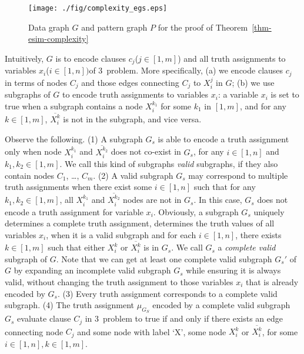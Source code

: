 \begin{figure}[tb!]
\begin{center}
\texttt{[image: ./fig/complexity\_egs.eps]}
\caption{Data graph $G$ and pattern graph $P$ for the proof of
  Theorem~\ref{thm-esim-complexity}}
\label{fig-esim-complexity}
\end{center}
\end{figure}

Intuitively, $G$ is to encode clauses $c_j$($j \in [1,m]$) and all truth assignments to variables $x_i$($i\in[1,n])$of 3\SAT\ problem. More specifically, (a) we encode clauses $c_j$ in terms of nodes $C_j$ and those edges connecting $C_j$ to $X_i^j$ in
$G$; (b) we use subgraphs of $G$ to encode truth assignments to variables $x_i$: a variable $x_i$ is set to true when a subgraph contains a node $X_i^{k_1}$ for some $k_1$ in $[1, m]$, and for any $k\in[1,m]$, $\overline{X_i^k}$ is not in the subgraph, and vice versa.

Observe the following.
(1) A subgraph $G_s$ is able to encode a truth assignment only when
node $X_i^{k_1}$ and $\overline{X_i^{k_2}}$ does not co-exist in
$G_s$, for any $i\in[1,n]$ and $k_1, k_2\in[1, m]$. We call this
kind of subgraphs {\em valid} subgraphs, if they also contain nodes
$C_1$, \ldots, $C_m$.
(2) A valid subgraph $G_s$ may correspond to multiple truth assignments
when there exist some $i\in [1,n]$ such that for any
$k_1,k_2\in[1,m]$, all $X_i^{k_1}$ and $\overline{X_i^{k_2}}$ nodes
are not in $G_s$. In this case, $G_s$ does not encode a truth
assignment for variable $x_i$. Obviously, a subgraph $G_s$ uniquely
determines a complete truth assignment, \ie determines the truth
values of all variables $x_i$, when it is a
valid subgraph and for each $i\in[1, n]$, there exists $k\in[1,
m]$ such that either $X_i^k$ or $\overline{X_i^k}$ is in $G_s$. We
call $G_s$ a {\em complete valid} subgraph of $G$. Note that we can
get at least one complete valid subgraph $G_s'$ of $G$ by expanding an
incomplete valid subgraph $G_s$ while ensuring it is always valid, without
changing the truth assignment to those variables $x_i$ that is already
encoded by $G_s$.
(3) Every truth assignment corresponds to a complete valid subgraph.
(4) The truth assignment $\mu_{G_S}$ encoded by a complete valid
subgraph $G_s$ evaluate clause $C_j$ in 3\SAT\ problem to true if and only
if there exists an edge connecting node $C_j$ and some node with
label `X', \ie some node $X_i^k$ or $\overline{X_i^k}$, for some
$i\in[1,n], k\in[1,m]$.


